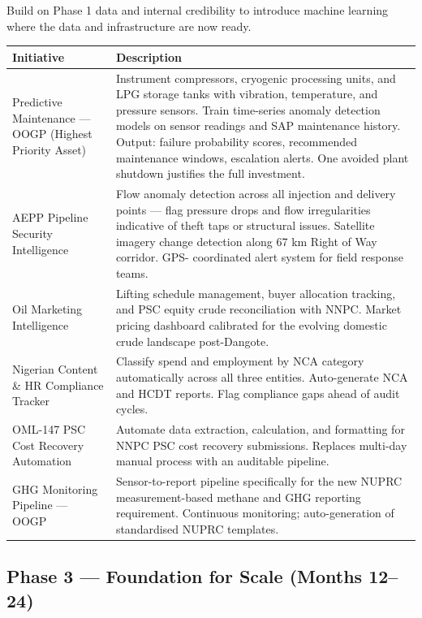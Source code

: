 \documentclass[10pt]{article}
\begin{document}
{\small
Build on Phase 1 data and internal credibility to introduce machine learning
where the data and infrastructure are now ready.}

\vspace{4pt}
\small
\begin{tabularx}{\columnwidth}{@{}lX@{}}
\toprule
\textbf{Initiative} & \textbf{Description} \\
\midrule
Predictive Maintenance --- OOGP (Highest Priority Asset)
  & Instrument compressors, cryogenic processing units, and LPG storage tanks with
    vibration, temperature, and pressure sensors. Train time-series anomaly detection
    models on sensor readings and SAP maintenance history. Output: failure probability
    scores, recommended maintenance windows, escalation alerts. One avoided plant
    shutdown justifies the full investment. \\[4pt]
AEPP Pipeline Security Intelligence
  & Flow anomaly detection across all injection and delivery points --- flag pressure
    drops and flow irregularities indicative of theft taps or structural issues.
    Satellite imagery change detection along 67 km Right of Way corridor. GPS-
    coordinated alert system for field response teams. \\[4pt]
Oil Marketing Intelligence
  & Lifting schedule management, buyer allocation tracking, and PSC equity crude
    reconciliation with NNPC. Market pricing dashboard calibrated for the evolving
    domestic crude landscape post-Dangote. \\[4pt]
Nigerian Content \& HR Compliance Tracker
  & Classify spend and employment by NCA category automatically across all three
    entities. Auto-generate NCA and HCDT reports. Flag compliance gaps ahead of
    audit cycles. \\[4pt]
OML-147 PSC Cost Recovery Automation
  & Automate data extraction, calculation, and formatting for NNPC PSC cost
    recovery submissions. Replaces multi-day manual process with an auditable
    pipeline. \\[4pt]
GHG Monitoring Pipeline --- OOGP
  & Sensor-to-report pipeline specifically for the new NUPRC measurement-based
    methane and GHG reporting requirement. Continuous monitoring; auto-generation
    of standardised NUPRC templates. \\
\bottomrule
\end{tabularx}
\normalsize

\vspace{8pt}
\subsection*{Phase 3 --- Foundation for Scale (Months 12--24)}
\end{document}
